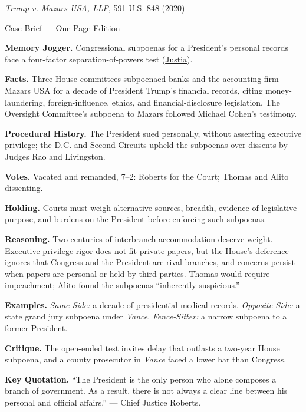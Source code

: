 \documentclass[12pt]{article}
\begin{document}
\begin{center}
{\Large \textit{Trump v. Mazars USA, LLP}, 591 U.S. 848 (2020)\par}
\vspace{0.3em}
{\normalsize Case Brief --- One-Page Edition\par}
\end{center}

\textbf{Memory Jogger.} Congressional subpoenas for a President's personal records face a four-factor separation-of-powers test (\href{https://supreme.justia.com/cases/federal/us/591/19-715/}{Justia}).

\textbf{Facts.} Three House committees subpoenaed banks and the accounting firm Mazars USA for a decade of President Trump's financial records, citing money-laundering, foreign-influence, ethics, and financial-disclosure legislation. The Oversight Committee's subpoena to Mazars followed Michael Cohen's testimony.

\textbf{Procedural History.} The President sued personally, without asserting executive privilege; the D.C. and Second Circuits upheld the subpoenas over dissents by Judges Rao and Livingston.

\textbf{Votes.} Vacated and remanded, 7--2: Roberts for the Court; Thomas and Alito dissenting.

\textbf{Holding.} Courts must weigh alternative sources, breadth, evidence of legislative purpose, and burdens on the President before enforcing such subpoenas.

\textbf{Reasoning.} Two centuries of interbranch accommodation deserve weight. Executive-privilege rigor does not fit private papers, but the House's deference ignores that Congress and the President are rival branches, and concerns persist when papers are personal or held by third parties. Thomas would require impeachment; Alito found the subpoenas ``inherently suspicious.''

\textbf{Examples.} \emph{Same-Side:} a decade of presidential medical records. \emph{Opposite-Side:} a state grand jury subpoena under \textit{Vance}. \emph{Fence-Sitter:} a narrow subpoena to a former President.

\textbf{Critique.} The open-ended test invites delay that outlasts a two-year House subpoena, and a county prosecutor in \textit{Vance} faced a lower bar than Congress.

\textbf{Key Quotation.} ``The President is the only person who alone composes a branch of government. As a result, there is not always a clear line between his personal and official affairs.'' --- Chief Justice Roberts.
\end{document}
